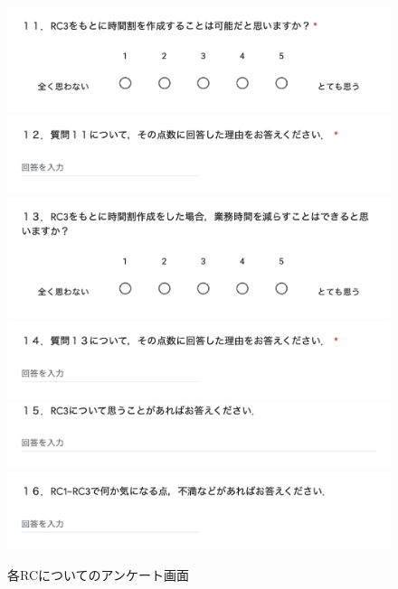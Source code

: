 \begin{figure}[htbp]
\begin{center}
\includegraphics[scale=0.5]{image/questionA/a12.eps}
\includegraphics[scale=0.5]{image/questionA/a13.eps}
\includegraphics[scale=0.5]{image/questionA/a14.eps}
\includegraphics[scale=0.5]{image/questionA/a15.eps}
\includegraphics[scale=0.5]{image/questionA/a16.eps}
\includegraphics[scale=0.5]{image/questionA/a17.eps}
\caption{各RCについてのアンケート画面}
\label{A3}
\end{center}
\end{figure}

